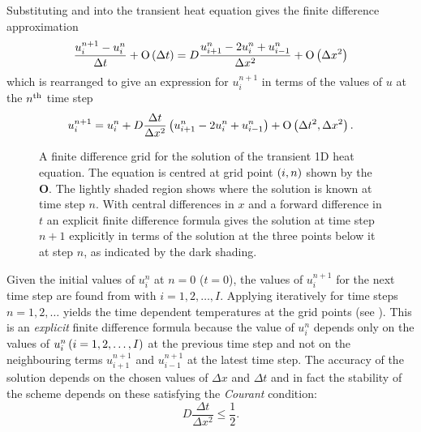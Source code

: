 Substituting  and  into the transient heat
equation  gives the finite difference approximation
\begin{equation*}
  \dfrac{u_{i}^{n+1}-u_{i}^{n}}{\Delta t} +  \mathrm{O}\left( \Delta t \right) 
   = D\dfrac{u_{i+1}^{n}-2u_{i}^{n}+u_{i-1}^{n}}{\Delta x^{2}} 
  +  \mathrm{O}\left( \Delta x^{2} \right) 
\end{equation*}
which is rearranged to give an expression for $u_{i}^{n+1}$ in terms of the
values of $u$ at the ${n}^{\text{th}}$ time step
\begin{equation}
  u_{i}^{n+1}  =  u_{i}^{n} + D \dfrac{\Delta t}{\Delta x^{2}}\left( 
    u_{i+1}^{n} -2u_{i}^{n} +u_{i-1}^{n} \right) 
  +  \mathrm{O}\left( \Delta t^{2}, \Delta x^{2} \right) .
  \label{eqn:rearr}
\end{equation}
 
\begin{figure} \centering
 
 \caption{A finite difference grid for the solution of the transient 1D 
   heat equation. The equation is centred at grid point $\left( i,n \right)$ shown by the
   $\mathbf{O}$. The lightly shaded region shows where the solution is known at
   time step $n$. With central differences in $x$ and a forward difference in
   $t$ an explicit finite difference formula gives the solution at time step
   $n+1$ explicitly in terms of the solution at the three points below it at
   step $n$, as indicated by the dark shading.}
 \label{fig:findiff}
\end{figure}

Given the initial values of $u_{i}^{n}$ at $n=0$ (\ie $t=0$), the values of
$u_{i}^{n+1}$ for the next time step are found from  with
$i=1,2,\ldots,I$. Applying  iteratively for time steps
$n=1,2,\ldots$ \etc yields the time dependent temperatures at the grid points
(see ). This is an \emph{ explicit} finite difference
formula because the value of $u_{i}^{n}$ depends only on the values of
$u_{i}^{n} \left( i=1,2,\ldots,I \right)$ at the previous time step and not on the
neighbouring terms $u_{i+1}^{n+1}$ and $u_{i-1}^{n+1}$ at the latest time
step. The accuracy of the solution depends on the chosen values of $\Delta x$
and $\Delta t$ and in fact the stability of the scheme depends on these
satisfying the \emph{Courant} condition:
\begin{equation}
  D\dfrac{\Delta t}{\Delta x^{2}} \leq \frac{1}{2}.
  \label{eqn:Courant}
\end{equation}

